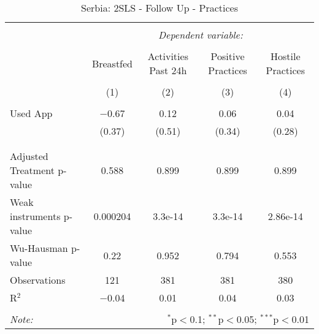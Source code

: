 
\begin{table}[!htbp] \centering 
  \caption{Serbia: 2SLS - Follow Up - Practices} 
  \label{tbl:Serbia: 2SLS - Follow Up - Practices} 
\begin{tabular}{@{\extracolsep{5pt}}lcccc} 
\\[-1.8ex]\hline 
\hline \\[-1.8ex] 
 & \multicolumn{4}{c}{\textit{Dependent variable:}} \\ 
\cline{2-5} 
\\[-1.8ex] & Breastfed & Activities Past 24h & Positive Practices & Hostile Practices \\ 
\\[-1.8ex] & (1) & (2) & (3) & (4)\\ 
\hline \\[-1.8ex] 
 Used App & $-$0.67 & 0.12 & 0.06 & 0.04 \\ 
  & (0.37) & (0.51) & (0.34) & (0.28) \\ 
  & & & & \\ 
\hline \\[-1.8ex] 
Adjusted Treatment p-value & 0.588 & 0.899 & 0.899 & 0.899 \\ 
Weak instruments p-value & 0.000204 & 3.3e-14 & 3.3e-14 & 2.86e-14 \\ 
Wu-Hausman p-value & 0.22 & 0.952 & 0.794 & 0.553 \\ 
Observations & 121 & 381 & 381 & 380 \\ 
R$^{2}$ & $-$0.04 & 0.01 & 0.04 & 0.03 \\ 
\hline 
\hline \\[-1.8ex] 
\textit{Note:}  & \multicolumn{4}{r}{$^{*}$p$<$0.1; $^{**}$p$<$0.05; $^{***}$p$<$0.01} \\ 
\end{tabular} 
\end{table} 
